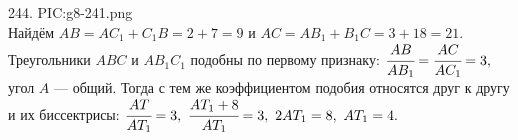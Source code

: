 244. {{PIC:g8-241.png}}\\
Найдём $AB=AC_1+C_1B=2+7=9$ и $AC=AB_1+B_1C=3+18=21.$ Треугольники $ABC$ и $AB_1C_1$ подобны по первому признаку: $\cfrac{AB}{AB_1}=\cfrac{AC}{AC_1}=3,$ угол $A$ --- общий. Тогда с тем же коэффициентом подобия относятся друг к другу и их биссектрисы: $\cfrac{AT}{AT_1}=3,\ \cfrac{AT_1+8}{AT_1}=3,\ 2AT_1=8,\ AT_1=4.$\\
